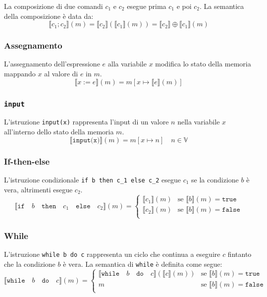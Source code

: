 La composizione di due comandi $c_1$ e $c_2$ esegue prima $c_1$ e poi $c_2$. La semantica della composizione è data da:
\[
\llbracket c_1; c_2 \rrbracket (m) = \llbracket c_2 \rrbracket (\llbracket c_1 \rrbracket (m)) = \llbracket c_2 \rrbracket \oplus \llbracket c_1 \rrbracket (m)
\]

\subsubsection{Assegnamento}

L'assegnamento dell'espressione $e$ alla variabile $x$ modifica lo stato della memoria mappando $x$ al valore di $e$ in $m$.
\[
\llbracket x := e \rrbracket (m) = m[x \mapsto \llbracket e \rrbracket (m)]
\]

\subsubsection{\texttt{input}}

L'istruzione \texttt{input(x)} rappresenta l'input di un valore
$n$ nella variabile $x$ all'interno dello stato della memoria $m$.
\[
\llbracket \texttt{input(x)} \rrbracket (m) = m[x \mapsto n] 
\quad n \in \mathbb{V}
\]

\subsubsection{If-then-else}

L'istruzione condizionale \texttt{if b then c_1 else c_2} esegue $c_1$
se la condizione $b$ è vera, altrimenti esegue $c_2$.
\[
\llbracket \texttt{if} \quad b \quad \texttt{then} \quad c_1 \quad \texttt{else} \quad c_2 \rrbracket (m) = 
\begin{cases}
\llbracket c_1 \rrbracket (m) & \text{se } \llbracket b \rrbracket
(m) = \texttt{true} \\
\llbracket c_2 \rrbracket (m) & \text{se } \llbracket b \rrbracket
(m) = \texttt{false} \\
\end{cases}
\]

\subsubsection{While}

L'istruzione \texttt{while b do c} rappresenta un ciclo che continua
a eseguire $c$ fintanto che la condizione $b$ è vera. La semantica di
\texttt{while} è definita come segue:
\[
\llbracket \texttt{while} \quad b \quad \texttt{do} \quad c
\rrbracket (m) =
\begin{cases}
\llbracket \texttt{while} \quad b \quad \texttt{do} \quad c
\rrbracket (\llbracket c \rrbracket (m)) & \text{se } \llbracket b
\rrbracket (m) = \texttt{true} \\
m & \text{se } \llbracket b \rrbracket (m) = \texttt{false} \\
\end{cases}
\]

